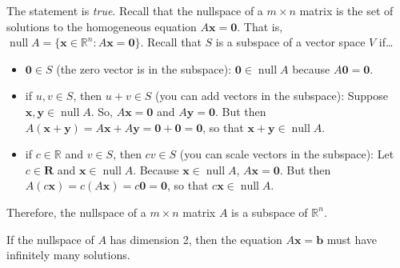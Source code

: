 \documentclass[11pt,letterpaper]{article}
\DeclareMathOperator{\Null}{null}
\begin{document}
\sol The statement is \textit{true}. Recall that the nullspace of a $m \times n$ matrix is the set of solutions to the homogeneous equation $A \mathbf{x}= \mathbf{0}$. That is, $\Null A= \{ \mathbf{x} \in \mathbb{R}^n \colon A \mathbf{x}= \mathbf{0} \}$. Recall that $S$ is a subspace of a vector space $V$ if\dots
	\begin{itemize}
	\item $\mathbf{0} \in S$ (the zero vector is in the subspace): $\mathbf{0} \in \Null A$ because $A \mathbf{0}= \mathbf{0}$. 
	\item if $u, v \in S$, then $u + v \in S$ (you can add vectors in the subspace): Suppose $\mathbf{x}, \mathbf{y} \in \Null A$. So, $A \mathbf{x}= \mathbf{0}$ and $A \mathbf{y}= \mathbf{0}$. But then $A(\mathbf{x} + \mathbf{y})= A \mathbf{x} + A\mathbf{y}= \mathbf{0} + \mathbf{0}= \mathbf{0}$, so that $\mathbf{x} + \mathbf{y} \in \Null A$.
	\item if $c \in \mathbb{R}$ and $v \in S$, then $cv \in S$ (you can scale vectors in the subspace): Let $c \in \mathbf{R}$ and $\mathbf{x} \in \Null A$. Because $\mathbf{x} \in \Null A$, $A\mathbf{x}= \mathbf{0}$. But then $A(c \mathbf{x})= c(A \mathbf{x})= c \mathbf{0}= \mathbf{0}$, so that $c \mathbf{x} \in \Null A$.
	\end{itemize}
Therefore, the nullspace of a $m \times n$ matrix $A$ is a subspace of $\mathbb{R}^n$. \pvspace{1.3cm}



 If the nullspace of $A$ has dimension 2, then the equation $A\mathbf{x}= \mathbf{b}$ must have infinitely many solutions. \pspace
\end{document}
